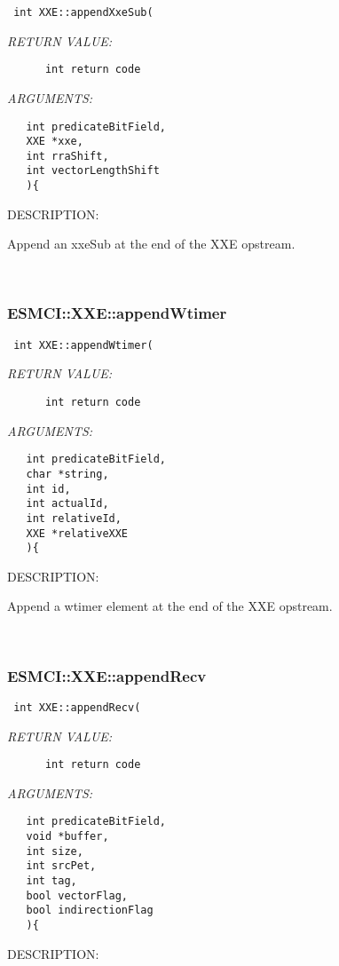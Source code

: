   
\begin{verbatim} int XXE::appendXxeSub(\end{verbatim}{\em RETURN VALUE:}
\begin{verbatim}      int return code\end{verbatim}{\em ARGUMENTS:}
\begin{verbatim}   int predicateBitField,
   XXE *xxe,
   int rraShift,
   int vectorLengthShift
   ){\end{verbatim}
{\sf DESCRIPTION:\\ }


    Append an xxeSub at the end of the XXE opstream. 
 
\mbox{}\hrulefill\
 
\subsubsection [ESMCI::XXE::appendWtimer] {ESMCI::XXE::appendWtimer}


  
\begin{verbatim} int XXE::appendWtimer(\end{verbatim}{\em RETURN VALUE:}
\begin{verbatim}      int return code\end{verbatim}{\em ARGUMENTS:}
\begin{verbatim}   int predicateBitField,
   char *string,
   int id,
   int actualId,
   int relativeId,
   XXE *relativeXXE
   ){\end{verbatim}
{\sf DESCRIPTION:\\ }


    Append a wtimer element at the end of the XXE opstream. 
 
\mbox{}\hrulefill\
 
\subsubsection [ESMCI::XXE::appendRecv] {ESMCI::XXE::appendRecv}


  
\begin{verbatim} int XXE::appendRecv(\end{verbatim}{\em RETURN VALUE:}
\begin{verbatim}      int return code\end{verbatim}{\em ARGUMENTS:}
\begin{verbatim}   int predicateBitField,
   void *buffer,
   int size,
   int srcPet,
   int tag,
   bool vectorFlag,
   bool indirectionFlag
   ){\end{verbatim}
{\sf DESCRIPTION:\\ }



